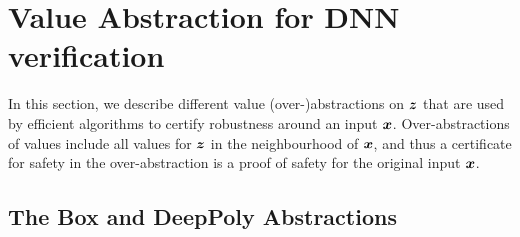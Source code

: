 	\section{Value Abstraction for DNN verification}

In this section, we describe different value (over-)abstractions on $\boldsymbol{z}$ that are used by efficient algorithms to certify robustness around an input $\boldsymbol{x}$. Over-abstractions of values include all values for $\boldsymbol{z}$ in the neighbourhood of $\boldsymbol{x}$, and thus a certificate for safety in the over-abstraction is a proof of safety for the original input $\boldsymbol{x}$.

\subsection{The Box and DeepPoly Abstractions}



